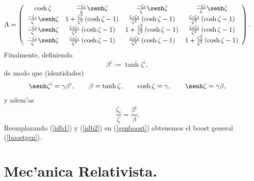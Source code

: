 \begin{equation}
\Lambda=\left(
\begin{array}
[c]{cccc}
\cosh\zeta & \frac{-\zeta_1}{\zeta}\senh\zeta & \frac
{-\zeta_2}{\zeta}\senh\zeta & \frac{-\zeta_3}{\zeta
}\senh\zeta\\
\frac{-\zeta_1}{\zeta}\senh\zeta & 1+\frac{\zeta_1^2}{\zeta^2}\left(  \cosh\zeta-1\right)  & \frac{\zeta_1\zeta_2}{\zeta
^2}\left(  \cosh\zeta-1\right)  & \frac{\zeta_1\zeta_3}{\zeta^2}\left(  \cosh\zeta-1\right) \\
\frac{-\zeta_2}{\zeta}\senh\zeta & \frac{\zeta_2\zeta_1}{\zeta^2}\left(  \cosh\zeta-1\right)  & 1+\frac{\zeta_2^2}{\zeta^2}\left(  \cosh\zeta-1\right)  & \frac{\zeta_2\zeta_3}{\zeta^2}\left(
\cosh\zeta-1\right) \\
\frac{-\zeta_3}{\zeta}\senh\zeta & \frac{\zeta_3\zeta_1}{\zeta^2}\left(  \cosh\zeta-1\right)  & \frac{\zeta_3\zeta_2}{\zeta
^2}\left(  \cosh\zeta-1\right)  & 1+\frac{\zeta_3^2}{\zeta^2}\left(
\cosh\zeta-1\right) \label{genboost}
\end{array}
\right).
\end{equation}
Finalmente, definiendo
\begin{equation}
\beta^i :=\tanh\zeta^i,
\end{equation}
de modo que (identidades)
\begin{equation}
\senh\zeta^i =\gamma\beta^i, \qquad \beta   =\tanh\zeta, \qquad
\cosh\zeta  =\gamma, \qquad \senh\zeta  =\gamma\beta, \label{idb1}
\end{equation}
y adem'as
\begin{equation}
\frac{\zeta_i}{\zeta}=\frac{\beta^i}{\beta}. \label{idb2}
\end{equation}
Reemplazando (\ref{idb1}) y (\ref{idb2}) en (\ref{genboost}) obtenemos el boost general (\ref{boostgen}).


\section{Mec'anica Relativista.}
